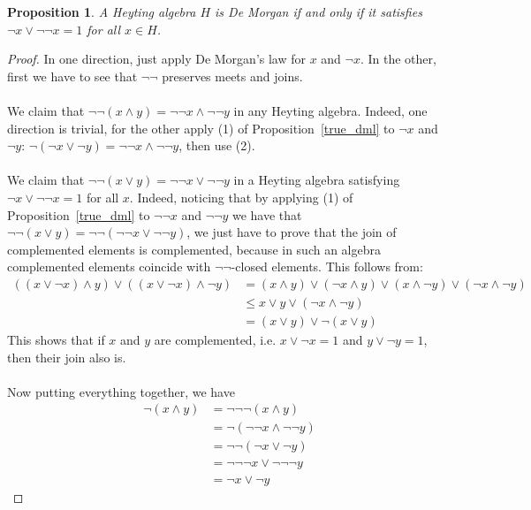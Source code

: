 \documentclass{article}
\newtheorem{proposition}[theorem]{Proposition}
\begin{document}
\begin{proposition}\label{comp_join}
    A Heyting algebra $H$ is De Morgan if and only if it satisfies $\neg x\lor \neg\neg x=1$ for all $x\in H$.
\end{proposition}
\begin{proof}
    In one direction, just apply De Morgan's law for $x$ and $\neg x$. In the other, first we have to see that $\neg\neg$ preserves meets and joins. \\
    \\
    We claim that $\neg\neg(x\land y)=\neg\neg x\land \neg\neg y$ in any Heyting algebra. Indeed, one direction is trivial, for the other apply (1) of Proposition~\ref{true_dml} to $\neg x$ and $\neg y$: $\neg (\neg x\lor \neg y)=\neg\neg x\land \neg \neg y$, then use (2).\\
    \\
    We claim that $\neg\neg(x\lor y)=\neg\neg x\lor \neg\neg y$ in a Heyting algebra satisfying $\neg x\lor \neg\neg x=1$ for all $x$. Indeed, noticing that by applying (1) of Proposition~\ref{true_dml} to $\neg\neg x$ and $\neg\neg y$ we have that $\neg\neg(x\lor y)=\neg\neg(\neg\neg x\lor \neg\neg y)$, we just have to prove that the join of complemented elements is complemented, because in such an algebra complemented elements coincide with $\neg\neg$-closed elements. This follows from:
\begin{align*}
    ((x\lor\neg x)\land y)\lor ((x\lor\neg x)\land \neg y) & = (x\land y)\lor(\neg x\land y)\lor(x\land \neg y)\lor(\neg x\land \neg y)\\
    & \leq x\lor y\lor  (\neg x\land \neg y)\\
    & =(x\lor y)\lor\neg (x\lor y)
\end{align*}
This shows that if $x$ and $y$ are complemented, i.e. $x\lor\neg x=1$ and $y\lor\neg y=1$, then their join also is.\\
\\
Now putting everything together, we have 
\begin{align*}
    \neg(x\land y) & =\neg\neg\neg(x\land y)\\
    & = \neg(\neg\neg x \land \neg\neg y)\\
    & = \neg\neg(\neg x\lor \neg y)\\
    & = \neg\neg\neg x\lor \neg\neg\neg y\\
    & = \neg x\lor \neg y
\end{align*}
\end{proof}
\end{document}

